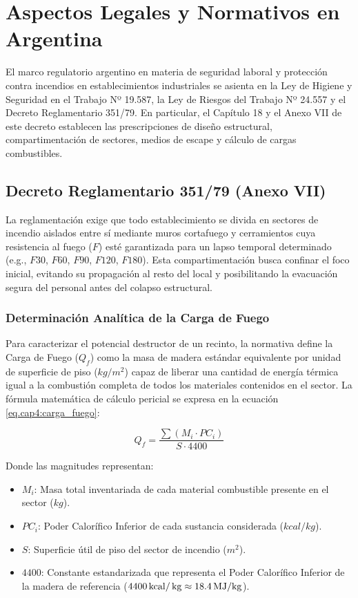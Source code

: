 \chapter{Aspectos Legales y Normativos en Argentina}
\label{sec.cap4:aspectos_legales}

El marco regulatorio argentino en materia de seguridad laboral y protección contra incendios en establecimientos
industriales se asienta en la Ley de Higiene y Seguridad en el Trabajo Nº 19.587, la Ley de Riesgos del Trabajo Nº 24.557
y el Decreto Reglamentario 351/79. En particular, el Capítulo 18 y el Anexo VII de este decreto establecen las
prescripciones de diseño estructural, compartimentación de sectores, medios de escape y cálculo de cargas combustibles.

\section{Decreto Reglamentario 351/79 (Anexo VII)}

La reglamentación exige que todo establecimiento se divida en sectores de incendio aislados entre sí mediante muros
cortafuego y cerramientos cuya resistencia al fuego ($F$) esté garantizada para un lapso temporal determinado (e.g.,
$F30$, $F60$, $F90$, $F120$, $F180$). Esta compartimentación busca confinar el foco inicial, evitando su propagación al
resto del local y posibilitando la evacuación segura del personal antes del colapso estructural.

\subsection{Determinación Analítica de la Carga de Fuego}

Para caracterizar el potencial destructor de un recinto, la normativa define la Carga de Fuego ($Q_f$) como la masa de
madera estándar equivalente por unidad de superficie de piso ($kg/m^2$) capaz de liberar una cantidad de energía térmica
igual a la combustión completa de todos los materiales contenidos en el sector. La fórmula matemática de cálculo pericial
se expresa en la ecuación \ref{eq.cap4:carga_fuego}:

\begin{equation}
\label{eq.cap4:carga_fuego}
Q_f = \frac{\sum (M_i \cdot PC_i)}{S \cdot 4400}
\end{equation}

Donde las magnitudes representan:
\begin{itemize}
    \item $M_i$: Masa total inventariada de cada material combustible presente en el sector ($kg$).
    \item $PC_i$: Poder Calorífico Inferior de cada sustancia considerada ($kcal/kg$).
    \item $S$: Superficie útil de piso del sector de incendio ($m^2$).
    \item $4400$: Constante estandarizada que representa el Poder Calorífico Inferior de la madera de referencia
          ($4400\,\mathrm{kcal}/\,\mathrm{kg} \approx 18.4\,\mathrm{MJ/kg}$).
\end{itemize}

